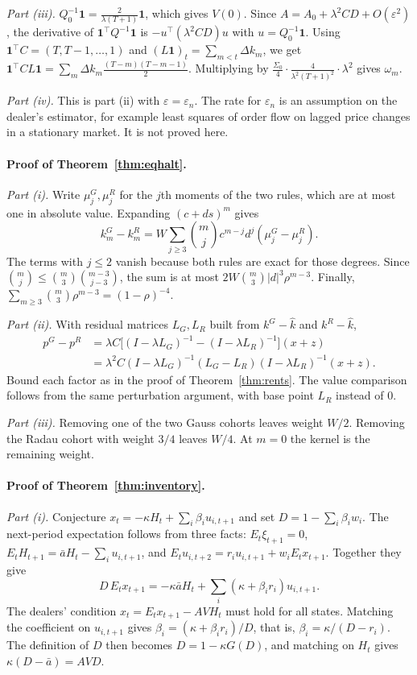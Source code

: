 \documentclass[12pt]{article}
\theoremstyle{definition}
\theoremstyle{remark}
\begin{document}
\emph{Part (iii).} $Q_0^{-1}\mathbf1=\frac{2}{\lambda(T+1)}\mathbf1$, which gives $V(0)$. Since $A=A_0+\lambda^2CD+O(\varepsilon^2)$, the derivative of $\mathbf1^\top Q^{-1}\mathbf1$ is $-u^\top(\lambda^2CD)u$ with $u=Q_0^{-1}\mathbf1$. Using $\mathbf1^\top C=(T,T-1,\ldots,1)$ and $(L\mathbf1)_t=\sum_{m<t}\Delta k_m$, we get $\mathbf1^\top CL\mathbf1=\sum_m\Delta k_m\frac{(T-m)(T-m-1)}2$. Multiplying by $\tfrac{\Sigma_0}4\cdot\frac{4}{\lambda^2(T+1)^2}\cdot\lambda^2$ gives $\omega_m$.

\emph{Part (iv).} This is part (ii) with $\varepsilon=\varepsilon_n$. The rate for $\varepsilon_n$ is an assumption on the dealer's estimator, for example least squares of order flow on lagged price changes in a stationary market. It is not proved here.

\paragraph{Proof of Theorem~\ref{thm:eqhalt}.}
\emph{Part (i).} Write $\mu_j^G,\mu_j^R$ for the $j$th moments of the two rules, which are at most one in absolute value. Expanding $(c+ds)^m$ gives
\[
k_m^G-k_m^R=W\sum_{j\ge3}\binom mj c^{m-j}d^j(\mu_j^G-\mu_j^R).
\]
The terms with $j\le2$ vanish because both rules are exact for those degrees. Since $\binom mj\le\binom m3\binom{m-3}{j-3}$, the sum is at most $2W\binom m3|d|^3\rho^{m-3}$. Finally, $\sum_{m\ge3}\binom m3\rho^{m-3}=(1-\rho)^{-4}$.

\emph{Part (ii).} With residual matrices $L_G,L_R$ built from $k^G-\hat k$ and $k^R-\hat k$,
\begin{align*}
p^G-p^R&=\lambda C\bigl[(I-\lambda L_G)^{-1}-(I-\lambda L_R)^{-1}\bigr](x+z)\\
&=\lambda^2C(I-\lambda L_G)^{-1}(L_G-L_R)(I-\lambda L_R)^{-1}(x+z).
\end{align*}
Bound each factor as in the proof of Theorem~\ref{thm:rents}. The value comparison follows from the same perturbation argument, with base point $L_R$ instead of $0$.

\emph{Part (iii).} Removing one of the two Gauss cohorts leaves weight $W/2$. Removing the Radau cohort with weight $3/4$ leaves $W/4$. At $m=0$ the kernel is the remaining weight.


\paragraph{Proof of Theorem~\ref{thm:inventory}.}
\emph{Part (i).} Conjecture $x_t=-\kappa H_t+\sum_i\beta_iu_{i,t+1}$ and set $D=1-\sum_i\beta_iw_i$. The next-period expectation follows from three facts: $E_t\xi_{t+1}=0$, $E_tH_{t+1}=\bar aH_t-\sum_iu_{i,t+1}$, and $E_tu_{i,t+2}=r_iu_{i,t+1}+w_iE_tx_{t+1}$. Together they give
\[
 D\,E_tx_{t+1}=-\kappa\bar aH_t+\sum_i(\kappa+\beta_ir_i)u_{i,t+1}.
\]
The dealers' condition $x_t=E_tx_{t+1}-AVH_t$ must hold for all states. Matching the coefficient on $u_{i,t+1}$ gives $\beta_i=(\kappa+\beta_ir_i)/D$, that is, $\beta_i=\kappa/(D-r_i)$. The definition of $D$ then becomes $D=1-\kappa G(D)$, and matching on $H_t$ gives $\kappa(D-\bar a)=AVD$.
\end{document}
